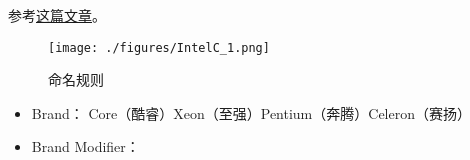 
\begin{issues}
\issueDraft
\end{issues}

参考\href{https://www.itechtics.com/processor-generations/}{这篇文章}。

\begin{figure}[ht]
\centering
\texttt{[image: ./figures/IntelC\_1.png]}
\caption{命名规则} \label{IntelC_fig1}
\end{figure}

\begin{itemize}
\item Brand： Core（酷睿）Xeon（至强）Pentium（奔腾）Celeron（赛扬）
\item Brand Modifier： 
\end{itemize}
